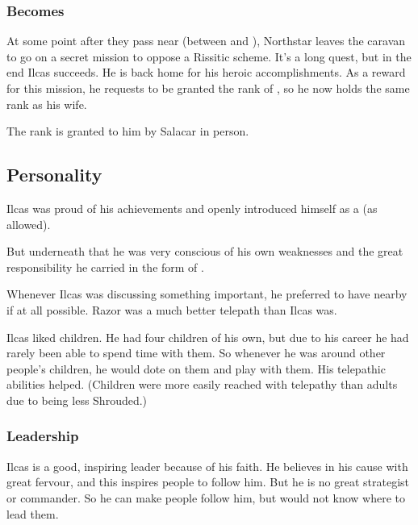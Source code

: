 \subsubsection{Becomes \Retaxis}
\index{\Retaxis}
At some point after they pass near \Redglen{} (between  and ), Northstar leaves the caravan to go on a secret mission to oppose a Rissitic scheme. 
It's a long quest, but in the end Ilcas succeeds. 
He is \honoured back home for his heroic accomplishments.
As a reward for this mission, he requests to be granted the \honorary rank of \Retaxis, so he now holds the same rank as his wife. 

The rank is granted to him by Salacar in person. 









\subsection{Personality}
Ilcas was proud of his achievements and openly introduced himself as a  (as  allowed). 

But underneath that he was very conscious of his own weaknesses and the great responsibility he carried in the form of . 

Whenever Ilcas was discussing something important, he preferred to have  nearby if at all possible. 
Razor was a much better telepath than Ilcas was. 

Ilcas liked children. 
He had four children of his own, but due to his career he had rarely been able to spend time with them. 
So whenever he was around other people's children, he would dote on them and play with them. 
His telepathic abilities helped. 
(Children were more easily reached with telepathy than adults due to being less Shrouded.)





\subsubsection{Leadership}
Ilcas is a good, inspiring leader because of his faith. 
He believes in his cause with great fervour, and this inspires people to follow him.
But he is no great strategist or commander. 
So he can make people follow him, but would not know where to lead them. 





